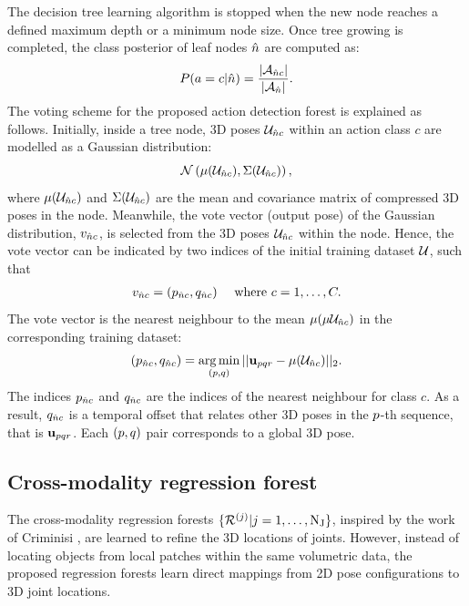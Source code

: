 The decision tree learning algorithm is stopped when the new node reaches a defined maximum depth or a minimum node size. Once tree growing is completed, the class posterior of leaf nodes ${\hat{n}}$ are computed as:  
\begin{equation}
	\label{eqn/body/dforest_treeposterior}
	P(a = c| {\hat{n}}) = \frac{|\mathcal{A}_{{\hat{n}} c}|}{| \mathcal{A}_{{\hat{n}}}|}.
\end{equation}
The voting scheme for the proposed action detection forest is explained as follows. 
Initially, inside a tree node, 3D poses $\mathcal{U}_{{\hat{n}} c}$ within an action class $c$ are modelled as a Gaussian distribution: 
\begin{equation}
	\label{eqn/body/nodegaussian}
	\mathcal{N}\left(\mu({\mathcal{U}}_{{\hat{n}} c}), \Sigma(\mathcal{U}_{{\hat{n}} c})\right),
\end{equation} 
where $\mu({\mathcal{U}}_{{\hat{n}} c})$ and $\Sigma(\mathcal{U}_{{\hat{n}} c})$ are the mean and covariance matrix of compressed 3D poses in the node. 
Meanwhile, the vote vector (output pose) of the Gaussian distribution, $v_{{\hat{n}} c}$, is selected from the 3D poses $\mathcal{U}_{{\hat{n}} c}$ within the node. Hence, the vote vector can be indicated by two indices of the initial training dataset $\mathcal{U}$, such that 
\begin{equation}
	\label{eqn/body/votevector}
	\begin{array}{lc}
		v_{{\hat{n}} c} = \left( p_{{\hat{n}} c}, q_{{\hat{n}} c}\right) & \mbox{ where }  
		c = 1,\dots,C.
	\end{array}
\end{equation} 
The vote vector is the nearest neighbour to the mean $\mu(\mu{\mathcal{U}}_{{\hat{n}} c})$ in the corresponding training dataset:
\begin{equation}
	\label{eqn/body/votenn}
	\left(p_{{\hat{n}} c}, q_{{\hat{n}} c}\right) =  
	\displaystyle\operatorname*{arg\,min}_{(p, q)} || \mathbf{u}_{pqr} - \mu({\mathcal{U}}_{{\hat{n}} c}) ||_{2}.
\end{equation}
The indices $p_{{\hat{n}} c}$ and $q_{{\hat{n}} c}$ are the indices of the nearest neighbour for class $c$.   
As a result, $q_{{\hat{n}} c}$ is a temporal offset that relates other 3D poses in the $p$-th sequence, that is $\mathbf{u}_{pqr}$. Each $(p, q)$ pair corresponds to a global 3D pose.  

\subsection{Cross-modality regression forest}
\label{sec/body/jrflearn}
The cross-modality regression forests $\{\mathcal{R}^{(j)}|{j} = 1,\dots,\mathrm{N_{J}}\}$, inspired by the work of Criminisi \etal \cite{Criminisi2011}, are learned to refine the 3D locations of joints. However, instead of locating objects from local patches within the same volumetric data, the proposed regression forests learn direct mappings from 2D pose configurations to 3D joint locations.

